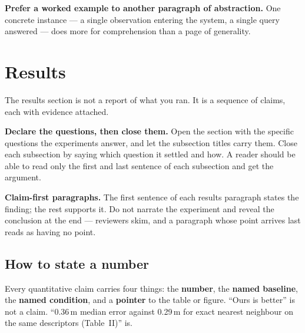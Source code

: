 \documentclass[11pt,a4paper]{article}
\newcommand{\lead}[1]{\medskip\noindent\textbf{#1}\quad}
\begin{document}
\lead{Prefer a worked example to another paragraph of abstraction.} One
concrete instance --- a single observation entering the system, a single query
answered --- does more for comprehension than a page of generality.

\section{Results}
\label{sec:results}

The results section is not a report of what you ran. It is a sequence of
claims, each with evidence attached.

\lead{Declare the questions, then close them.} Open the section with the
specific questions the experiments answer, and let the subsection titles carry
them. Close each subsection by saying which question it settled and how. A
reader should be able to read only the first and last sentence of each
subsection and get the argument.

\lead{Claim-first paragraphs.} The first sentence of each results paragraph
states the finding; the rest supports it. Do not narrate the experiment and
reveal the conclusion at the end --- reviewers skim, and a paragraph whose
point arrives last reads as having no point.

\subsection*{How to state a number}

Every quantitative claim carries four things: the \textbf{number}, the
\textbf{named baseline}, the \textbf{named condition}, and a \textbf{pointer}
to the table or figure. ``Ours is better'' is not a claim. ``0.36\,m median
error against 0.29\,m for exact nearest neighbour on the same descriptors
(Table~II)'' is.
\end{document}
